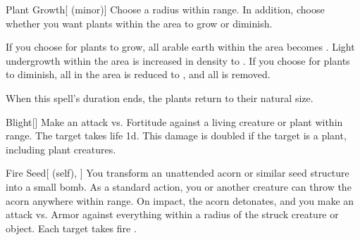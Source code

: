 \lowercase{\hypertarget{spell:Plant Growth}{}}\label{spell:Plant Growth}
\begin{freeability}[\nth{1}]{\hypertarget{spell:Plant Growth}{Plant Growth}}[ (minor)]
Choose a \areamed radius within \rngmed range.
In addition, choose whether you want plants within the area to grow or diminish.

If you choose for plants to grow, all arable earth within the area becomes .
Light undergrowth within the area is increased in density to .
If you choose for plants to diminish, all  in the area is reduced to , and all  is removed.

When this spell's duration ends, the plants return to their natural size.
\end{freeability}
\vspace{0.25em}



\lowercase{\hypertarget{spell:Blight}{}}\label{spell:Blight}
\begin{freeability}[\nth{2}]{\hypertarget{spell:Blight}{Blight}}[]
Make an attack vs. Fortitude against a living creature or plant within \rngmed range.
\hit The target takes life  \plus1d.
This damage is doubled if the target is a plant, including plant creatures.
\end{freeability}
\vspace{0.25em}



\lowercase{\hypertarget{spell:Fire Seed}{}}\label{spell:Fire Seed}
\begin{attuneability}[\nth{2}]{\hypertarget{spell:Fire Seed}{Fire Seed}}[ (self), ]
You transform an unattended acorn or similar seed structure into a small bomb.
As a standard action, you or another creature can throw the acorn anywhere within \rngclose range.
On impact, the acorn detonates, and you make an attack vs. Armor against everything within a \areasmall radius of the struck creature or object.
\hit Each target takes fire .
\end{attuneability}
\vspace{0.25em}



